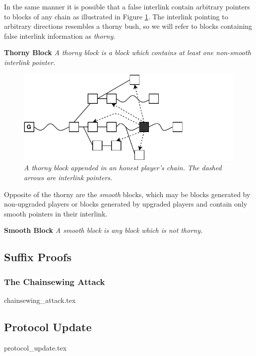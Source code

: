 In the same manner it is possible that a false interlink contain arbitrary pointers to blocks of any chain as illustrated in Figure \ref{fig:thorny_block}. The interlink pointing to arbitrary directions resembles a thorny bush, so we will refer to blocks containing false interlink information as \emph{thorny}. 

\begin{defn}{\textbf{Thorny Block}}
	\textit{A thorny block is a block which contains at least one non-smooth interlink pointer.}
	\label{defn:thorny_block}
\end{defn}

\begin{figure}[h]
	\begin{center}
		\includegraphics[scale=0.75]{figures/thorny_block.pdf}
	\end{center}
	\caption{\textit{A thorny block appended in an honest player's chain. The dashed arrows
	are interlink pointers.}}
	\label{fig:thorny_block}
\end{figure}

Opposite of the thorny are the \emph{smooth} blocks, which may be blocks generated by non-upgraded players or blocks generated by upgraded players and contain only smooth pointers in their interlink.

\begin{defn}{\textbf{Smooth Block}}
	\textit{A smooth block is any block which is not thorny.}
	\label{defn:smooth_block}
\end{defn}

\subsection{Suffix Proofs}

\subsubsection{The Chainsewing Attack}
{chainsewing_attack.tex}

\subsection{Protocol Update}
{protocol_update.tex}
